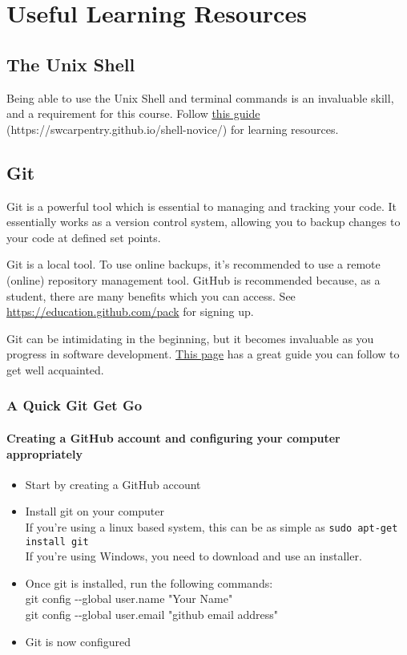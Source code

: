 \section{Useful Learning Resources}
\subsection{The Unix Shell}
\label{app:UsefulResources}
Being able to use the Unix Shell and terminal commands is an invaluable skill, and a requirement for this course. Follow \href{https://swcarpentry.github.io/shell-novice/}{this guide} (https://swcarpentry.github.io/shell-novice/) for learning resources.

\subsection{Git}
\label{app:Git}
Git is a powerful tool which is essential to managing and tracking your code. It essentially works as a version control system, allowing you to backup changes to your code at defined set points.

Git is a local tool. To use online backups, it's recommended to use a remote (online) repository management tool. GitHub is recommended because, as a student, there are many benefits which you can access. See \href{https://education.github.com/pack}{https://education.github.com/pack} for signing up.

Git can be intimidating in the beginning, but it becomes invaluable as you progress in software development. \href{https://swcarpentry.github.io/git-novice/}{This page} has a great guide you can follow to get well acquainted.

\subsubsection{A Quick Git Get Go}
\paragraph{Creating a GitHub account and configuring your computer appropriately}
\begin{itemize}
    \item Start by creating a GitHub account
    \item Install git on your computer\\
    If you're using a linux based system, this can be as simple as \verb|sudo apt-get install git|\\
    If you're using Windows, you need to download and use an installer.
    \item Once git is installed, run the following commands:\\
    git config \--\--global user.name "Your Name"\\
    git config \--\--global user.email "github email address"
    \item Git is now configured
\end{itemize}

